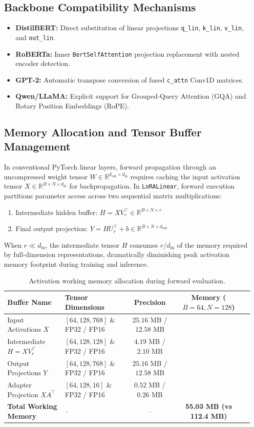 \subsection{Backbone Compatibility Mechanisms}
\begin{itemize}
\item \textbf{DistilBERT:} Direct substitution of linear projections \texttt{q\_lin}, \texttt{k\_lin}, \texttt{v\_lin}, and \texttt{out\_lin}.
\item \textbf{RoBERTa:} Inner \texttt{BertSelfAttention} projection replacement with nested encoder detection.
\item \textbf{GPT-2:} Automatic transpose conversion of fused \texttt{c\_attn} Conv1D matrices.
\item \textbf{Qwen/LLaMA:} Explicit support for Grouped-Query Attention (GQA) and Rotary Position Embeddings (RoPE).
\end{itemize}

\subsection{Memory Allocation and Tensor Buffer Management}
In conventional PyTorch linear layers, forward propagation through an uncompressed weight tensor $W \in \mathbb{R}^{d_{\text{out}} \times d_{\text{in}}}$ requires caching the input activation tensor $X \in \mathbb{R}^{B \times N \times d_{\text{in}}}$ for backpropagation. In \texttt{LoRALinear}, forward execution partitions parameter access across two sequential matrix multiplications:
\begin{enumerate}
\item Intermediate hidden buffer: $H = X V_r^\top \in \mathbb{R}^{B \times N \times r}$
\item Final output projection: $Y = H U_r^\top + b \in \mathbb{R}^{B \times N \times d_{\text{out}}}$
\end{enumerate}
When $r \ll d_{\text{in}}$, the intermediate tensor $H$ consumes $r / d_{\text{in}}$ of the memory required by full-dimension representations, dramatically diminishing peak activation memory footprint during training and inference.

\begin{table}[H]
\centering
\small
\begin{tabularx}{\linewidth}{llccc}
\toprule
\textbf{Buffer Name} & \textbf{Tensor Dimensions} & \textbf{Precision} & \textbf{Memory ($B=64, N=128$)} \\
\midrule
Input Activations $X$ & $[64, 128, 768]$ \& FP32 / FP16 & $25.16$ MB / $12.58$ MB \\
Intermediate $H = X V_r^\top$ & $[64, 128, 128]$ \& FP32 / FP16 & $4.19$ MB / $2.10$ MB \\
Output Projections $Y$ & $[64, 128, 768]$ \& FP32 / FP16 & $25.16$ MB / $12.58$ MB \\
Adapter Projection $X A^\top$ & $[64, 128, 16]$ \& FP32 / FP16 & $0.52$ MB / $0.26$ MB \\
\midrule
\textbf{Total Working Memory} & -- & -- & \textbf{55.03 MB (vs 112.4 MB)} \\
\bottomrule
\end{tabularx}
\caption{Activation working memory allocation during forward evaluation.}
\end{table}
